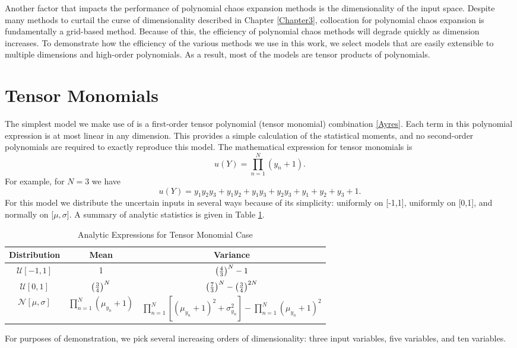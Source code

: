 Another factor that impacts the performance of polynomial chaos expansion methods is the dimensionality of the input space.  Despite 
many methods to curtail the curse of dimensionality described in Chapter \ref{Chapter3}, collocation for polynomial chaos expansion
is fundamentally a grid-based method.  Because of this, the efficiency of polynomial chaos methods will degrade quickly as
dimension increases.  To demonstrate how the efficiency of the various methods we use in this work, we select models that are
easily extensible to multiple dimensions and high-order polynomials.  As a result, most of the models are tensor products of
polynomials.


\section{Tensor Monomials}\label{mod:first tensor poly}
The simplest model we make use of is a first-order tensor polynomial (tensor monomial) combination \ref{Ayres}.
Each term in this polynomial expression is at most linear in any dimension.  This provides a simple calculation
of the statistical moments, and no second-order polynomials are required to exactly reproduce this model.
The mathematical expression for tensor monomials is
\begin{equation}
  u(Y) = \prod_{n=1}^N (y_n+1).
\end{equation}
For example, for $N=3$ we have
\begin{equation}
  u(Y) = y_1y_2y_3 + y_1y_2 + y_1y_3 + y_2y_3 + y_1 + y_2 + y_3 + 1.
\end{equation}
For this model we distribute the uncertain inputs in several ways because of its simplicity: uniformly on [-1,1], uniformly on
[0,1], and normally on [$\mu,\sigma$]. A summary of analytic statistics is given in Table \ref{tab:tensormono moments}.

\begin{table}[H]
  \centering
  \begin{tabular}{c|c|c}
    Distribution & Mean & Variance \\\hline
    $\mathcal{U}[-1,1]$ & 1 & $\qty(\frac{4}{3})^N - 1$ \\
    $\mathcal{U}[0,1]$ & $\qty(\frac{3}{4})^N$ & $\qty(\frac{7}{3})^N - \qty(\frac{3}{4})^{2N}$ \\
    $\mathcal{N}[\mu,\sigma]$ & $\prod_{n=1}^N (\mu_{y_n}+1)$ & $\prod_{n=1}^N[(\mu_{y_n}+1)^2+\sigma_{y_n}^2]
    - \prod_{n=1}^N (\mu_{y_n}+1)^2$
  \end{tabular}
  \caption{Analytic Expressions for Tensor Monomial Case}
  \label{tab:tensormono moments}
\end{table}
For purposes of demonstration, we pick several increasing orders of dimensionality: three input variables, five variables, and 
ten variables.

